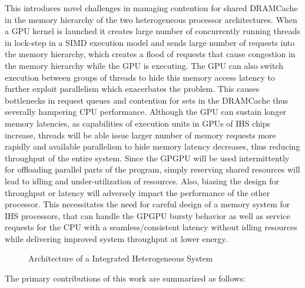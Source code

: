\par This introduces novel challenges in managing contention for shared DRAMCache in the memory hierarchy of the two heterogeneous processor architectures. When a GPU kernel is launched it creates large number of concurrently running threads in lock-step in a SIMD execution model and sends large number of requests into the memory hierarchy, which creates a flood of requests that cause congestion in the memory hierarchy while the GPU is executing. The GPU can also switch execution between groups of threads to hide this memory access latency to further exploit parallelism which exacerbates the problem. This causes bottlenecks in request queues and contention for sets in the DRAMCache thus severally hampering CPU performance. Although the GPU can sustain longer memory latencies, as capabilities of execution units in GPUs of IHS chips increase, threads will be able issue larger number of memory requests more rapidly and available parallelism to hide memory latency decreases, thus reducing throughput of the entire system. Since the GPGPU will be used intermittently for offloading parallel parts of the program, simply reserving shared resources will lead to idling and under-utilization of resources. Also, biasing the design for throughput or latency will adversely impact the performance of the other processor. This necessitates the need for careful design of a memory system for IHS processors, that can handle the GPGPU bursty behavior as well as service requests for the CPU with a seamless/consistent latency without idling resources while delivering improved system throughput at lower energy.


\begin{figure*}[!htb]
    \centering
    \hsacpu
    \caption{Architecture of a Integrated Heterogeneous System}
    \label{hsa-arch}
\end{figure*}
The primary contributions of this work are summarized as follows:

